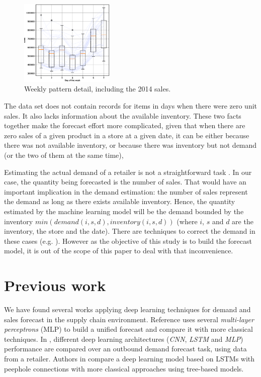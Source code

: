 \documentclass{elsarticle}
\begin{document}
	\begin{figure}
		\centering
		\includegraphics[width=0.4\textwidth]{img/timeseries_dow}
		\caption{Weekly pattern detail, including the 2014 sales.}
		\label{fig:timeseries_detail}
	\end{figure}

	The data set does not contain records for items in days when there were zero unit sales. It also lacks information about the available inventory. These two facts together make the forecast effort more complicated, given that when there are zero sales of a given product in a store at a given date, it can be either because there was not available inventory, or because there was inventory but not demand (or the two of them at the same time),
	
	Estimating the actual demand of a retailer is not a straightforward task \cite{Deep2019}. In our case, the quantity being forecasted is the number of sales. That would have an important implication in the demand estimation: the number of sales represent the demand as long as there exists available inventory. Hence, the quantity estimated by the machine learning model will be the demand bounded by the inventory $min(demand(i,s,d), inventory(i,s,d))$ (where $i$, $s$ and $d$ are the inventory, the store and the date). There are techniques to correct the demand in these cases (e.g. \cite{Bell2000}). However as the objective of this study is to build the forecast model, it is out of the scope of this paper to deal with that inconvenience.
	
	\section{Previous work}	\label{sec:prevwork}
	We have found several works applying deep learning techniques for demand and sales forecast in the supply chain environment. Reference \cite{Kilimci2019} uses several \textit{multi-layer perceptrons} (MLP) to build a unified forecast and compare it with more classical techniques. In \cite{Talupula2018}, different deep learning architectures (\textit{CNN}, \textit{LSTM} and \textit{MLP}) performance are compared over an outbound demand forecast task, using data from a retailer. Authors in \cite{Helmini2019} compare a deep learning model based on LSTMs with peephole connections with more classical approaches using tree-based models. 
	
\end{document}
